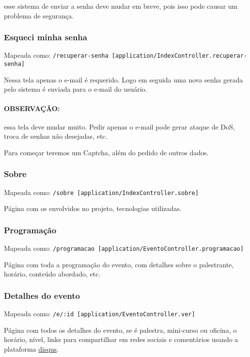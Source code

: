 esse sistema de enviar a senha deve mudar em breve, pois isso pode
causar um problema de segurança.

\subsubsection{Esqueci minha senha \label{esqueci-senha}}

Mapeada como:
\texttt{/recuperar-senha {[}application/IndexController.recuperar-senha{]}}

Nessa tela apenas o e-mail é requerido. Logo em seguida uma nova senha
gerada pelo sistema é enviada para o e-mail do usuário.

\paragraph{OBSERVAÇÃO:}

essa tela deve mudar muito. Pedir apenas o e-mail pode gerar ataque de
DoS, troca de senhas não desejadas, etc.

Para começar teremos um Captcha, além do pedido de outros dados.

\subsubsection{Sobre \label{sobre}}

Mapeada como: \texttt{/sobre {[}application/IndexController.sobre{]}}

Página com os envolvidos no projeto, tecnologias utilizadas.

\subsubsection{Programação \label{programacao}}

Mapeada como:
\texttt{/programacao {[}application/EventoController.programacao{]}}

Página com toda a programação do evento, com detalhes sobre o
palestrante, horário, conteúdo abordado, etc.

\subsubsection{Detalhes do evento \label{evento}}

Mapeada como: \texttt{/e/:id {[}application/EventoController.ver{]}}

Página com todos os detalhes do evento, se é palestra, mini-curso ou
oficina, o horário, nível, links para compartilhar em redes sociais e
comentários usando a plataforma \href{http://disqus.com/}{disqus}.


